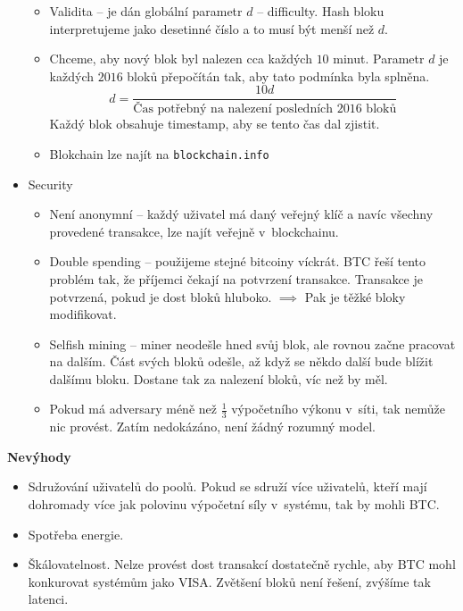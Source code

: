 \documentclass[a4paper,12pt,titlepage]{article}
\def\podnadpis#1{{\bigskip\bf\noindent#1\medskip\par}}
\begin{document}
\begin{itemize}
		\begin{itemize}
			\item{Validita -- je dán globální parametr \(d\) -- difficulty. 
			Hash bloku interpretujeme jako desetinné číslo a to musí být menší než \(d\).}
			\item{Chceme, aby nový blok byl nalezen cca každých \(10\) minut. 
				Parametr \(d\) je každých \(2016\) bloků přepočítán tak, aby tato podmínka byla splněna.
				\[d = \frac{10 d }{\text{Čas potřebný na nalezení posledních 2016 bloků}}\]
				Každý blok obsahuje timestamp, aby se tento čas dal zjistit.}
			\item{Blokchain lze najít na \texttt{blockchain.info}}
		\end{itemize}
	\item{Security}
		\begin{itemize}
			\item{Není anonymní -- každý uživatel má daný veřejný klíč a navíc všechny provedené transakce, 
			lze najít veřejně v~blockchainu.}
			\item{Double spending -- 
				použijeme stejné bitcoiny víckrát.
				BTC řeší tento problém tak, že příjemci čekají na potvrzení transakce. 
				Transakce je potvrzená, pokud je dost bloků hluboko. \(\implies\) Pak je těžké bloky modifikovat.}
			\item{Selfish mining --
				miner neodešle hned svůj blok, ale rovnou začne pracovat na dalším. 
				Část svých bloků odešle, až když se někdo další bude blížit dalšímu bloku.
				Dostane tak za nalezení bloků, víc než by měl.}
			\item{Pokud má adversary méně než \(\frac{1}{3}\) výpočetního výkonu v~síti, 
				tak nemůže nic  provést. 
				Zatím nedokázáno, není žádný rozumný model.}
		\end{itemize}
\end{itemize}
	
\podnadpis{Nevýhody}
	\begin{itemize}
		\item{Sdružování uživatelů do poolů. 
		Pokud se sdruží více uživatelů, kteří mají dohromady více jak polovinu výpočetní síly v~systému, 
		tak by mohli  BTC.}
		\item{Spotřeba energie.}
		\item{Škálovatelnost. Nelze provést dost transakcí dostatečně rychle, 
			aby BTC mohl konkurovat systémům jako VISA. Zvětšení bloků není řešení, zvýšíme tak latenci.}
	\end{itemize}
\end{document}
